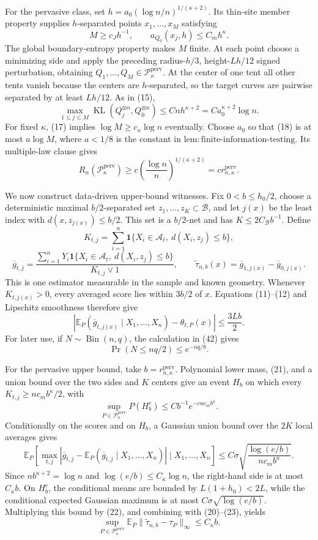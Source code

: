 For the pervasive class, set \(h=a_0(\log n/n)^{1/(\kappa+2)}\). Its thin-site member property supplies \(h\)-separated points \(x_1,\ldots,x_M\) satisfying
\[
 M\ge c_Jh^{-1},\qquad a_{Q_0}(x_j,h)\le C_mh^\kappa. \tag{17}
\]
The global boundary-entropy property makes \(M\) finite. At each point choose a minimizing side and apply the preceding radius-\(h/3\), height-\(Lh/12\) signed perturbation, obtaining \(Q_1,\ldots,Q_M\in\mathcal P_\kappa^{\mathrm{perv}}\). At the center of one tent all other tents vanish because the centers are \(h\)-separated, so the target curves are pairwise separated by at least \(Lh/12\). As in (15),
\[
 \max_{1\le j\le M}\operatorname{KL}(Q_j^{\otimes n},Q_0^{\otimes n})
 \le Cnh^{\kappa+2}=Ca_0^{\kappa+2}\log n. \tag{18}
\]
For fixed \(\kappa\), (17) implies \(\log M\ge c_\kappa\log n\) eventually. Choose \(a_0\) so that (18) is at most \(a\log M\), where \(a<1/8\) is the constant in \(\mathrm{lem:finite\text{-}information\text{-}testing}\). Its multiple-law clause gives
\[
 R_n(\mathcal P_\kappa^{\mathrm{perv}})
 \ge c\left(\frac{\log n}{n}\right)^{1/(\kappa+2)}
 =c r_{n,\kappa}^{\mathrm{perv}}. \tag{19}
\]

We now construct data-driven upper-bound witnesses. Fix \(0<b\le h_0/2\), choose a deterministic maximal \(b/2\)-separated set \(z_1,\ldots,z_K\subset\mathcal B\), and let \(j(x)\) be the least index with \(d(x,z_{j(x)})\le b/2\). This set is a \(b/2\)-net and has \(K\le2C_{\mathcal B}b^{-1}\). Define
\[
 K_{t,j}=\sum_{i=1}^n\mathbf1\{X_i\in\mathcal A_t,\ d(X_i,z_j)\le b\},
\]
\[
 \overline g_{t,j}=\frac{\sum_{i=1}^nY_i\mathbf1\{X_i\in\mathcal A_t,\ d(X_i,z_j)\le b\}}{K_{t,j}\vee1},
 \qquad
 \widetilde\tau_{n,b}(x)=\overline g_{1,j(x)}-\overline g_{0,j(x)}.
\]
This is one estimator measurable in the sample and known geometry. Whenever \(K_{t,j(x)}>0\), every averaged score lies within \(3b/2\) of \(x\). Equations (11)--(12) and Lipschitz smoothness therefore give
\[
 \left|\mathbb E_P(\overline g_{t,j(x)}\mid X_1,\ldots,X_n)-\theta_{t,P}(x)\right|\le\frac{3Lb}{2}. \tag{20}
\]
For later use, if \(N\sim\operatorname{Bin}(n,q)\), the calculation in (42) gives
\[
 \Pr(N\le nq/2)\le e^{-nq/8}. \tag{21}
\]

For the pervasive upper bound, take \(b=r_{n,\kappa}^{\mathrm{perv}}\). Polynomial lower mass, (21), and a union bound over the two sides and \(K\) centers give an event \(H_b\) on which every \(K_{t,j}\ge nc_mb^\kappa/2\), with
\[
 \sup_{P\in\mathcal P_\kappa^{\mathrm{perv}}}P(H_b^c)
 \le Cb^{-1}e^{-cnc_mb^\kappa}. \tag{22}
\]
Conditionally on the scores and on \(H_b\), a Gaussian union bound over the \(2K\) local averages gives
\[
 \mathbb E_P\!\left[
 \max_{t,j}|\overline g_{t,j}-\mathbb E_P(\overline g_{t,j}\mid X_1,\ldots,X_n)|
 \mid X_1,\ldots,X_n\right]
 \le C\sigma\sqrt{\frac{\log(e/b)}{nc_mb^\kappa}}. \tag{23}
\]
Since \(nb^{\kappa+2}=\log n\) and \(\log(e/b)\le C_\kappa\log n\), the right-hand side is at most \(C_\kappa b\). On \(H_b^c\), the conditional means are bounded by \(L(1+h_0)<2L\), while the conditional expected Gaussian maximum is at most \(C\sigma\sqrt{\log(e/b)}\). Multiplying this bound by (22), and combining with (20)--(23), yields
\[
 \sup_{P\in\mathcal P_\kappa^{\mathrm{perv}}}
 \mathbb E_P\|\widetilde\tau_{n,b}-\tau_P\|_\infty
 \le C_\kappa b. \tag{24}
\]

